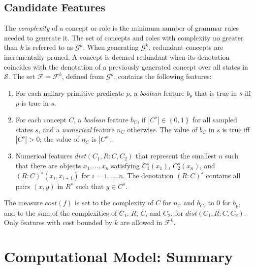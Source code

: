 \documentclass[letterpaper]{article} %
\newcommand{\set}[1]{\ensuremath{\left\{#1 \right\}}}
\newcommand{\F}{\mathcal{F}}
\renewcommand{\S}{\mathcal{S}}
\newcommand{\G}{\mathcal{G}}
\begin{document}
\subsection{Candidate Features}

The \emph{complexity} of a concept or role is the minimum number of grammar  rules needed to generate it.
The set of concepts and roles with complexity no greater than  $k$ is referred to as  $\G^k$.
When generating  $\G^k$,  redundant  concepts are incrementally pruned. A concept is deemed
redundant when its  denotation coincides with the denotation of a previously generated concept
over all  states in $\S$.  The set $\F=\F^k$, defined from $\G^k$, contains the following features:
\begin{enumerate}[{\small$\bullet$}]
  \item For each nullary primitive predicate $p$, a \emph{boolean}
    feature $b_p$ that is true in $s$ iff $p$ is true in $s$.
  \item For each concept $C$, a \emph{boolean} feature $b_C$, if $|C^s| \in \set{0,1}$
    for all sampled states $s$, and a \emph{numerical} feature $n_C$ otherwise.
    The value of $b_C$ in $s$ is true iff $|C^s| > 0$; the value of $n_C$ is $|C^s|$.
  \item Numerical features $\textit{dist}(C_1,R{:}C,C_2)$ that represent the
    smallest $n$ such that there are objects $x_1, \ldots, x_n$ satisfying
    $C_1^s(x_1)$, $C_2^s(x_{n})$, and $(R{:}C)^s(x_i,x_{i+1})$ for $i=1,\ldots,n$.
    The denotation $(R{:}C)^s$ contains all pairs $(x,y)$ in $R^s$ such that $y\in C^s$.
\end{enumerate}

The measure $cost(f)$ is set to the complexity of $C$ for $n_C$ and $b_C$,
to $0$ for $b_p$,  and to the sum of the complexities of $C_1$, $R$, $C$, and $C_2$, for $\textit{dist}(C_1,R{:}C,C_2)$.
Only features with cost bounded by $k$ are allowed in $\F^k$.

\section{Computational Model: Summary}
\end{document}
